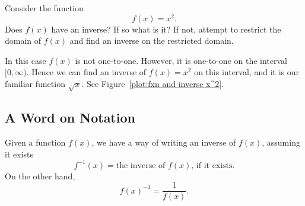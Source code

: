 \documentclass{ximera}
\begin{document}
\begin{example}
Consider the function
\[
f(x) = x^2.
\]
Does $f(x)$ have an inverse? If so what is it? If not, attempt to
restrict the domain of $f(x)$ and find an inverse on the restricted
domain.
\end{example}


\begin{solution}
In this case $f(x)$ is not one-to-one. However, it is one-to-one on
the interval $[0,\infty)$. Hence we can find an inverse of $f(x)=x^2$
  on this interval, and it is our familiar function $\sqrt{x}$.  See
  Figure~\ref{plot:fxn and inverse x^2}.
\end{solution}

\begin{image}
\end{image}


\subsection{A Word on Notation}

Given a function $f(x)$, we have a way of writing an inverse of $f(x)$, assuming it exists
\[
f^{-1}(x) = \text{the inverse of $f(x)$, if it exists.}
\]
On the other hand,
\[
f(x)^{-1} = \frac{1}{f(x)}.
\]
\end{document}

